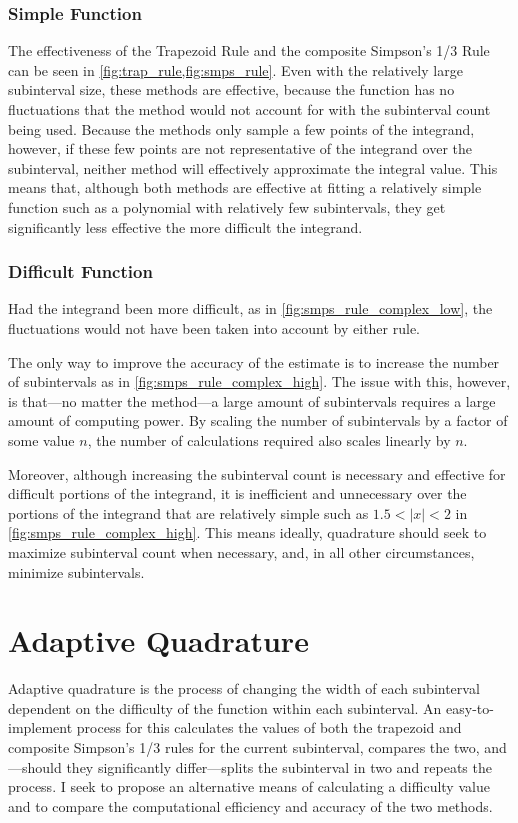 \documentclass{paper}
\begin{document}
\subsubsection{Simple Function}
\label{sec:simple}
The effectiveness of the Trapezoid Rule and the composite Simpson's 1/3 Rule can be seen in \cref{fig:trap_rule,fig:smps_rule}.
Even with the relatively large subinterval size, these methods are effective, because the function has no fluctuations that the method would not account for with the subinterval count being used.
Because the methods only sample a few points of the integrand, however, if these few points are not representative of the integrand over the subinterval, neither method will effectively approximate the integral value.
This means that, although both methods are effective at fitting a relatively simple function such as a polynomial with relatively few subintervals, they get significantly less effective the more difficult the integrand.

\subsubsection{Difficult Function}
\label{sec:complex_examples}
Had the integrand been more difficult, as in \cref{fig:smps_rule_complex_low}, the fluctuations would not have been taken into account by either rule.



The only way to improve the accuracy of the estimate is to increase the number of subintervals as in \cref{fig:smps_rule_complex_high}.
The issue with this, however, is that---no matter the method---a large amount of subintervals requires a large amount of computing power.
By scaling the number of subintervals by a factor of some value \(n\), the number of calculations required also scales linearly by \(n\).



Moreover, although increasing the subinterval count is necessary and effective for difficult portions of the integrand, it is inefficient and unnecessary over the portions of the integrand that are relatively simple such as \(1.5 < |x| < 2\) in \cref{fig:smps_rule_complex_high}.
This means ideally, quadrature should seek to maximize subinterval count when necessary, and, in all other circumstances, minimize subintervals.

\section{Adaptive Quadrature}
\label{sec:adaptive}
Adaptive quadrature is the process of changing the width of each subinterval dependent on the difficulty of the function within each subinterval.
An easy-to-implement process for this calculates the values of both the trapezoid and composite Simpson's 1/3 rules for the current subinterval, compares the two, and---should they significantly differ---splits the subinterval in two and repeats the process.\autocite[p. 1]{established}
I seek to propose an alternative means of calculating a difficulty value and to compare the computational efficiency and accuracy of the two methods.
\end{document}
